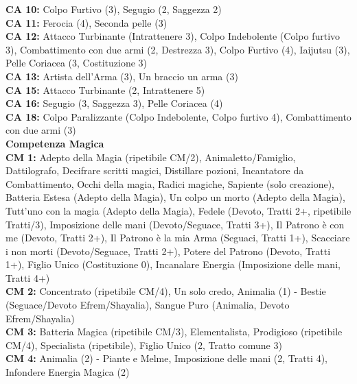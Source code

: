 \begin{multicols}{2}
	\textbf{CA 10:} Colpo Furtivo (3), Segugio (2, Saggezza 2)\\

	\textbf{CA 11:} Ferocia (4), Seconda pelle (3)\\

	\textbf{CA 12:} Attacco Turbinante (Intrattenere 3), Colpo Indebolente (Colpo furtivo 3), Combattimento con due armi (2, Destrezza 3), Colpo Furtivo (4), Iaijutsu (3), Pelle Coriacea (3, Costituzione 3)\\

	\textbf{CA 13:} Artista dell'Arma (3), Un braccio un arma (3)\\

	\textbf{CA 15:} Attacco Turbinante (2, Intrattenere 5)\\

	\textbf{CA 16:} Segugio (3, Saggezza 3), Pelle Coriacea (4)\\

	\textbf{CA 18:} Colpo Paralizzante (Colpo Indebolente, Colpo furtivo 4), Combattimento con due armi (3)\\

\textbf{{\large Competenza Magica}}\\

	\textbf{CM 1:} Adepto della Magia (ripetibile CM/2), Animaletto/Famiglio, Dattilografo, Decifrare scritti magici, Distillare pozioni, Incantatore da Combattimento, Occhi della magia, Radici magiche, Sapiente (solo creazione), Batteria Estesa (Adepto della Magia), Un colpo un morto (Adepto della Magia), Tutt'uno con la magia (Adepto della Magia), Fedele (Devoto, Tratti 2+, ripetibile Tratti/3), Imposizione delle mani (Devoto/Seguace, Tratti 3+), Il Patrono è con me (Devoto, Tratti 2+), Il Patrono è la mia Arma (Seguaci, Tratti 1+), Scacciare i non morti (Devoto/Seguace, Tratti 2+), Potere del Patrono (Devoto, Tratti 1+), Figlio Unico (Costituzione 0), Incanalare Energia (Imposizione delle mani, Tratti 4+)\\

	\textbf{CM 2:} Concentrato (ripetibile CM/4), Un solo credo, Animalia (1) - Bestie (Seguace/Devoto Efrem/Shayalia), Sangue Puro (Animalia, Devoto Efrem/Shayalia)\\

	\textbf{CM 3:} Batteria Magica (ripetibile CM/3), Elementalista, Prodigioso (ripetibile CM/4), Specialista (ripetibile), Figlio Unico (2, Tratto comune 3)\\

	\textbf{CM 4:} Animalia (2) - Piante e Melme, Imposizione delle mani (2, Tratti 4), Infondere Energia Magica (2)\\


\end{multicols}
